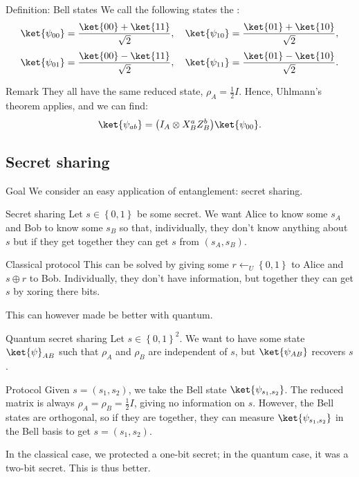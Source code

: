 \documentclass[a4paper]{article}
\begin{document}
\begin{parag}{Definition: Bell states}
    We call the following states the : 
    \[\ket{\psi_{00}} = \frac{\ket{00} + \ket{11}}{\sqrt{2}}, \mathspace \ket{\psi_{10}} = \frac{\ket{01} + \ket{10}}{\sqrt{2}},\]
    \[\ket{\psi_{01}} = \frac{\ket{00} - \ket{11}}{\sqrt{2}}, \mathspace \ket{\psi_{11}} = \frac{\ket{01} - \ket{10}}{\sqrt{2}}.\]
    
    \begin{subparag}{Remark}
        They all have the same reduced state, $\rho_A = \frac{1}{2} I$. Hence, Uhlmann's theorem applies, and we can find: 
        \[\ket{\psi_{ab}} = \left(I_A \otimes X_B^a Z_B^b\right) \ket{\psi_{00}}.\]
    \end{subparag}
\end{parag}

\subsection{Secret sharing}

\begin{parag}{Goal}
    We consider an easy application of entanglement: secret sharing.
\end{parag}

\begin{parag}{Secret sharing}
    Let $s \in \left\{0, 1\right\}$ be some secret. We want Alice to know some $s_A$ and Bob to know some $s_B$ so that, individually, they don't know anything about $s$ but if they get together they can get $s$ from $\left(s_A, s_B\right)$. 

    \begin{subparag}{Classical protocol}
        This can be solved by giving some $r \leftarrow_U \left\{0, 1\right\}$ to Alice and $s \oplus r$ to Bob. Individually, they don't have information, but together they can get $s$ by xoring there bits.

        This can however made be better with quantum.
    \end{subparag}
\end{parag}

\begin{parag}{Quantum secret sharing}
    Let $s \in \left\{0, 1\right\}^2$. We want to have some state $\ket{\psi}_{AB}$ such that $\rho_A$ and $\rho_B$ are independent of $s$, but $\ket{\psi_{AB}}$ recovers $s$.

    \begin{subparag}{Protocol}
        Given $s = \left(s_1, s_2\right)$, we take the Bell state $\ket{\psi_{s_1, s_2}}$. The reduced matrix is always $\rho_A = \rho_B = \frac{1}{2} I$, giving no information on $s$. However, the Bell states are orthogonal, so if they are together, they can measure $\ket{\psi_{s_1, s_2}}$ in the Bell basis to get $s = \left(s_1, s_2\right)$.

        In the classical case, we protected a one-bit secret; in the quantum case, it was a two-bit secret. This is thus better.
    \end{subparag}
\end{parag}
\end{document}
